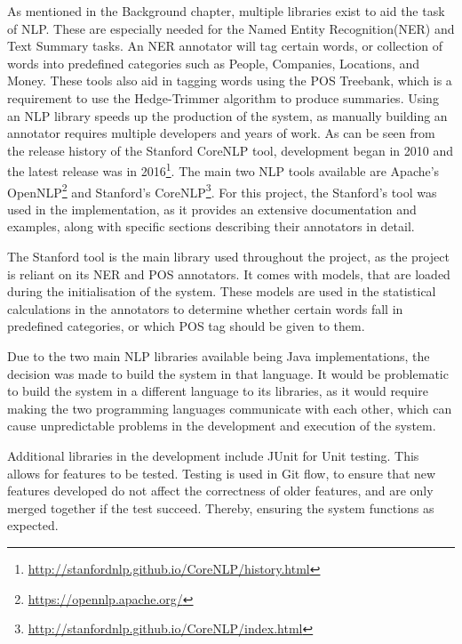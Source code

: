 \par As mentioned in the Background chapter, multiple libraries exist to aid the task of NLP. These are especially needed for the Named Entity Recognition(NER) and Text Summary tasks. An NER annotator will tag certain words, or collection of words into predefined categories such as People, Companies, Locations, and Money. These tools also aid in tagging words using the POS Treebank, which is a requirement to use the Hedge-Trimmer algorithm \cite{dorrzajicschwartz2003} to produce summaries. Using an NLP library speeds up the production of the system, as manually building an annotator requires multiple developers and years of work. As can be seen from the release history of the Stanford CoreNLP tool, development began in 2010 and the latest release was in 2016\footnote{\url{http://stanfordnlp.github.io/CoreNLP/history.html}}. The main two NLP tools available are Apache's OpenNLP\footnote{\url{https://opennlp.apache.org/}} and Stanford's CoreNLP\footnote{\url{http://stanfordnlp.github.io/CoreNLP/index.html}}. For this project, the Stanford's tool was used in the implementation, as it provides an extensive documentation and examples, along with specific sections describing their annotators in detail.

\par The Stanford tool is the main library used throughout the project, as the project is reliant on its NER \cite{finkelgrenagermanning2005} and POS \cite{toutanovakleinmanningsinger2003} annotators. It comes with models, that are loaded during the initialisation of the system. These models are used in the statistical calculations in the annotators to determine whether certain words fall in predefined categories, or which POS tag should be given to them.

\par Due to the two main NLP libraries available being Java implementations, the decision was made to build the system in that language. It would be problematic to build the system in a different language to its libraries, as it would require making the two programming languages communicate with each other, which can cause unpredictable problems in the development and execution of the system.

\par Additional libraries in the development include JUnit for Unit testing. This allows for features to be tested. Testing is used in Git flow, to ensure that new features developed do not affect the correctness of older features, and are only merged together if the test succeed. Thereby, ensuring the system functions as expected.


